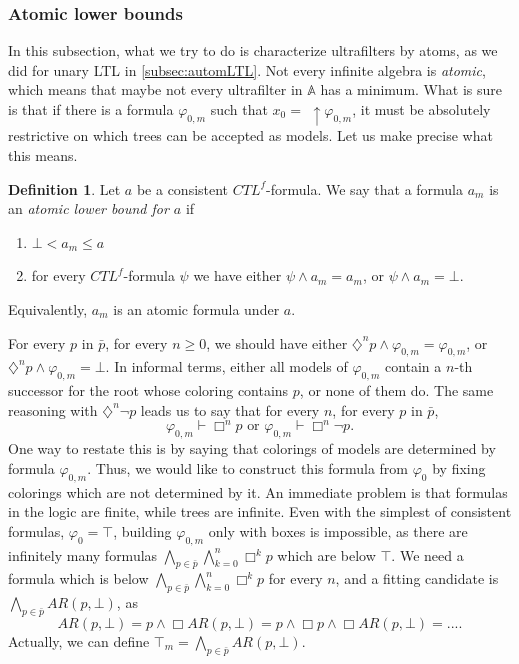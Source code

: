 \documentclass[11pt]{article}
\newcommand{\A}{{\mathbb{A}}}
\newcommand{\dia}{{\diamondsuit}}
\theoremstyle{definition}
\newtheorem{definition}{Definition}
\begin{document}
\subsubsection*{Atomic lower bounds}
In this subsection, what we try to do is characterize ultrafilters by atoms, as we did for unary LTL in \ref{subsec:automLTL}.
Not every infinite algebra is \emph{atomic}, which means that maybe not every ultrafilter in $\A$ has a minimum.
What is sure is that if there is a formula $\varphi_{0,m}$ such that $x_0 =$ $\uparrow\varphi_{0,m}$,
it must be absolutely restrictive on which trees can be accepted as models. Let us make precise what this means. 
\begin{definition}\label{phi_m}
    Let $a$ be a consistent $CTL^f$-formula. We say that a formula $a_m$ is an \emph{atomic lower bound for $a$} if 
    \begin{enumerate}
        \item $\bot<a_m\leq a$
        \item for every $CTL^f$-formula $\psi$ we have either $\psi\wedge a_m=a_m$, or $\psi\wedge a_m=\bot$.
    \end{enumerate}
    Equivalently, $a_m$ is an atomic formula under $a$.
\end{definition}
For every $p$ in $\bar{p}$, for every $n \geq 0$, we should have either $\dia^np \wedge \varphi_{0,m} = \varphi_{0,m}$, 
or $\dia^np \wedge \varphi_{0,m} =\bot$. In informal terms, either all models of $\varphi_{0,m}$ contain a $n$-th successor 
for the root whose coloring contains $p$, or none of them do. The same reasoning with $\dia^n\neg p$ leads us to say that for every $n$, 
for every $p$ in $\bar{p}$, \[\varphi_{0,m}\vdash\Box^n p\mbox{ or } \varphi_{0,m}\vdash\Box^n\neg p.\]
One way to restate this is by saying that colorings of models are determined by formula $\varphi_{0,m}$. 
Thus, we would like to construct this formula from $\varphi_0$ by fixing colorings which are not determined by it. 
An immediate problem is that formulas in the logic are finite, while trees are infinite. 
Even with the simplest of consistent formulas, $\varphi_0 = \top$, building $\varphi_{0,m}$ only with boxes is impossible, 
as there are infinitely many formulas $\bigwedge_{p\in\bar{p}}\bigwedge_{k=0}^n\Box^k p$ which are below $\top$. 
We need a formula which is below $\bigwedge_{p\in\bar{p}}\bigwedge_{k=0}^n\Box^k p$ for every $n$, and a fitting candidate 
is $\bigwedge_{p\in\bar{p}}AR(p,\bot)$, as \[AR(p,\bot)=p\wedge\Box AR(p,\bot)=p\wedge\Box p\wedge \Box AR(p,\bot)=... .\] 
Actually, we can define $\top_m=\bigwedge_{p\in\bar{p}}AR(p,\bot)$. 
\end{document}
